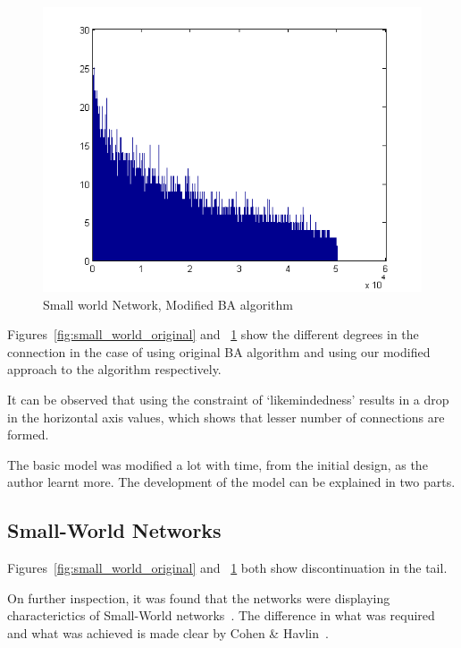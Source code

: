 \begin{figure}
\centering
\includegraphics[scale=0.75]{Figures/50000m2_small_world}
\caption[Small World Network with Modified Algorithm]{Small world Network, Modified BA algorithm}
\label{fig:small_world_modified}
\end{figure}

Figures~\ref{fig:small_world_original} and ~\ref{fig:small_world_modified} show the different degrees in the connection in the case of using original BA algorithm and using our modified approach to the algorithm respectively.

It can be observed that using the constraint of `likemindedness' results in a drop in the horizontal axis values, which shows that lesser number of connections are formed.

The basic model was modified a lot with time, from the initial design, as the author learnt more. The development of the model can be explained in two parts.

\subsection{Small-World Networks}
Figures~\ref{fig:small_world_original} and ~\ref{fig:small_world_modified} both show discontinuation in the tail. 

On further inspection, it was found that the networks were displaying characterictics of Small-World networks~\cite{smallWorld}. The difference in what was required and what was achieved is made clear by Cohen \& Havlin~\cite{PhysRevLett.90.058701}.

